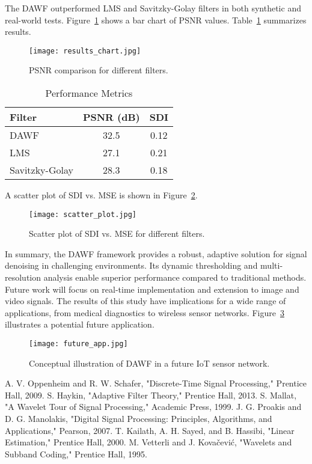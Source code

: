 \documentclass{article}
\begin{document}
The DAWF outperformed LMS and Savitzky-Golay filters in both synthetic and real-world tests. Figure~\ref{fig:results} shows a bar chart of PSNR values. Table~\ref{tab:results} summarizes results.
\begin{figure}[h!]
\centering
\texttt{[image: results\_chart.jpg]}
\caption{PSNR comparison for different filters.}
\label{fig:results}
\end{figure}
\begin{table}[h!]
\centering
\caption{Performance Metrics}
\begin{tabular}{|l|c|c|}
\hline
Filter & PSNR (dB) & SDI \\
\hline
DAWF & 32.5 & 0.12 \\
LMS & 27.1 & 0.21 \\
Savitzky-Golay & 28.3 & 0.18 \\
\hline
\end{tabular}
\label{tab:results}
\end{table}
A scatter plot of SDI vs. MSE is shown in Figure~\ref{fig:scatter}.
\begin{figure}[h!]
\centering
\texttt{[image: scatter\_plot.jpg]}
\caption{Scatter plot of SDI vs. MSE for different filters.}
\label{fig:scatter}
\end{figure}

In summary, the DAWF framework provides a robust, adaptive solution for signal denoising in challenging environments. Its dynamic thresholding and multi-resolution analysis enable superior performance compared to traditional methods. Future work will focus on real-time implementation and extension to image and video signals. The results of this study have implications for a wide range of applications, from medical diagnostics to wireless sensor networks. Figure~\ref{fig:future} illustrates a potential future application.
\begin{figure}[h!]
\centering
\texttt{[image: future\_app.jpg]}
\caption{Conceptual illustration of DAWF in a future IoT sensor network.}
\label{fig:future}
\end{figure}

\begin{thebibliography}{9}
A. V. Oppenheim and R. W. Schafer, "Discrete-Time Signal Processing," Prentice Hall, 2009.
S. Haykin, "Adaptive Filter Theory," Prentice Hall, 2013.
S. Mallat, "A Wavelet Tour of Signal Processing," Academic Press, 1999.
J. G. Proakis and D. G. Manolakis, "Digital Signal Processing: Principles, Algorithms, and Applications," Pearson, 2007.
T. Kailath, A. H. Sayed, and B. Hassibi, "Linear Estimation," Prentice Hall, 2000.
M. Vetterli and J. Kovačević, "Wavelets and Subband Coding," Prentice Hall, 1995.
\end{thebibliography}
\end{document}
